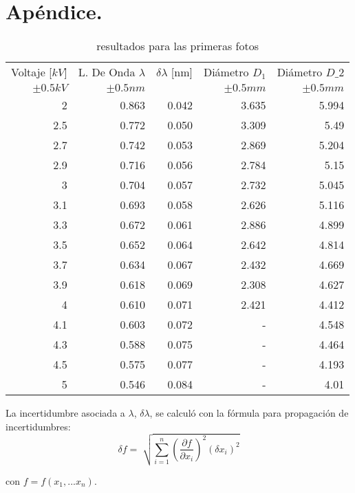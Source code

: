 \documentclass[letterpaper,12pt]{article}
\begin{document}
 \section{Apéndice.}
 \begin{table}[htbp]
  \centering
  \caption{resultados para las primeras fotos}
    \begin{tabular}{|r|r|r|r|r|}
    \toprule 
    Voltaje [$kV$] & L. De Onda $\lambda$ & $\delta \lambda$ [nm] & Diámetro $D_1$ & Diámetro $D\_2$ \\
    
    $\pm 0.5 kV$ & $\pm 0.5nm$ &       & $\pm 0.5mm$ & $\pm 0.5mm$ \\
    \midrule
    2     & 0.863 & 0.042 & 3.635 & 5.994 \\
    2.5   & 0.772 & 0.050 & 3.309 & 5.49 \\
    2.7   & 0.742 & 0.053 & 2.869 & 5.204 \\
    2.9   & 0.716 & 0.056 & 2.784 & 5.15 \\
    3     & 0.704 & 0.057 & 2.732 & 5.045 \\
    3.1   & 0.693 & 0.058 & 2.626 & 5.116 \\
    3.3   & 0.672 & 0.061 & 2.886 & 4.899 \\
    3.5   & 0.652 & 0.064 & 2.642 & 4.814 \\
    3.7   & 0.634 & 0.067 & 2.432 & 4.669 \\
    3.9   & 0.618 & 0.069 & 2.308 & 4.627 \\
    4     & 0.610 & 0.071 & 2.421 & 4.412 \\
    4.1   & 0.603 & 0.072 & -     & 4.548 \\
    4.3   & 0.588 & 0.075 & -     & 4.464 \\
    4.5   & 0.575 & 0.077 & -     & 4.193 \\
    5     & 0.546 & 0.084 & -     & 4.01 \\
    \bottomrule
    \end{tabular}%
  \label{tab:addlabel}%
\end{table}%
La incertidumbre asociada a $\lambda$, $\delta \lambda$, se calculó con la fórmula para propagación de incertidumbres:
\large $$ \delta f =\sqrt[]{\sum_{i=1}^n (\frac{\partial f}{\partial x_i})^2(\delta x_i)^2 } $$ 

con $f=f(x_1,...x_n)$.
\end{document}
